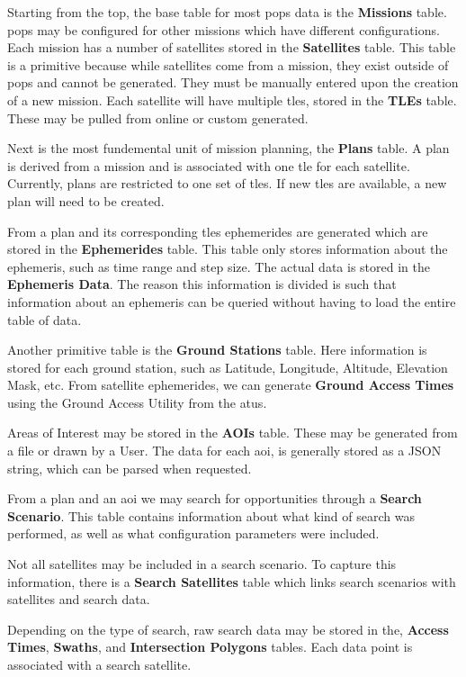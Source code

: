 Starting from the top, the base table for most \gls{pops} data is the
\textbf{Missions} table. \gls{pops} may be configured for other missions which
have different configurations. Each mission has a number of satellites stored
in the \textbf{Satellites} table. This table is a primitive because while
satellites come from a mission, they exist outside of \gls{pops} and cannot be
generated. They must be manually entered upon the creation of a new mission.
Each satellite will have multiple \glspl{tle}, stored in the \textbf{TLEs}
table. These may be pulled from online or custom generated.

Next is the most fundemental unit of mission planning, the \textbf{Plans}
table. A plan is derived from a mission and is associated with one \gls{tle}
for each satellite. Currently, plans are restricted to one set of \glspl{tle}.
If new \glspl{tle} are available, a new plan will need to be created. 

From a plan and its corresponding \glspl{tle} ephemerides are generated which
are stored in the \textbf{Ephemerides} table. This table only stores
information about the ephemeris, such as time range and step size. The actual
data is stored in the \textbf{Ephemeris Data}. The reason this information is
divided is such that information about an ephemeris can be queried without
having to load the entire table of data.

Another primitive table is the \textbf{Ground Stations} table. Here information
is stored for each ground station, such as Latitude, Longitude, Altitude,
Elevation Mask, etc. From satellite ephemerides, we can generate \textbf{Ground
Access Times} using the Ground Access Utility from the \glspl{atu}.

Areas of Interest may be stored in the \textbf{AOIs} table. These may be
generated from a file or drawn by a User. The data for each \gls{aoi}, is
generally stored as a JSON string, which can be parsed when requested.

From a plan and an \gls{aoi} we may search for opportunities through a
\textbf{Search Scenario}.  This table contains information about what kind of
search was performed, as well as what configuration parameters were included.

Not all satellites may be included in a search scenario. To capture this
information, there is a \textbf{Search Satellites} table which links search
scenarios with satellites and search data.

Depending on the type of search, raw search data may be stored in the,
\textbf{Access Times}, \textbf{Swaths}, and \textbf{Intersection Polygons}
tables. Each data point is associated with a search satellite. 

